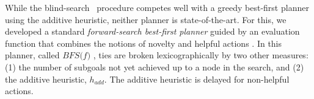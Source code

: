 

While the blind-search \SR\ procedure competes well with a greedy
best-first planner using the additive heuristic, neither planner is
state-of-the-art.  For this, we developed a standard
\emph{forward-search best-first planner} guided by an evaluation function
that combines the notions of novelty and
helpful actions \cite{nir:ecai12,hoffmann:ff}. In this planner, called $\textit{BFS(f)}$ \cite{nir:ecai12}, ties are broken
lexicographically by two other measures:
(1) the number of subgoals not yet achieved up to a node in the search, and
(2) the additive heuristic, $h_{add}$. The additive heuristic is delayed for non-helpful actions.

